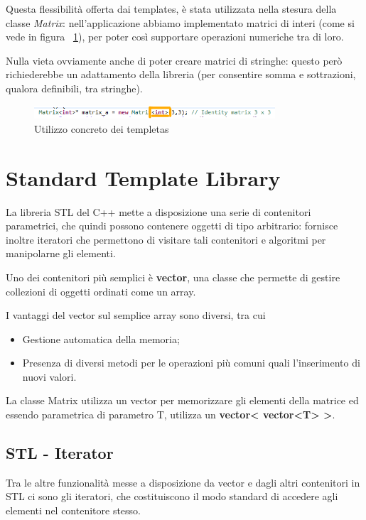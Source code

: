 Questa flessibilità offerta dai templates, è stata utilizzata nella stesura della classe \textit{Matrix}: nell'applicazione abbiamo implementato matrici di interi (come si vede in figura ~\ref{fig:templates}), per poter così supportare operazioni numeriche tra di loro.

Nulla vieta ovviamente anche di poter creare matrici di stringhe: questo però richiederebbe un adattamento della libreria (per consentire somma e sottrazioni, qualora definibili, tra stringhe).
\begin{figure}[h]
	\centering
	\includegraphics[width=0.8\textwidth]{Immagini/ConcreteteTemplates.png}
	\caption{Utilizzo concreto dei templetas}
	\label{fig:templates}
\end{figure}

\section{Standard Template Library}
La libreria STL del C++ mette a disposizione una serie di contenitori parametrici, che quindi
possono contenere oggetti di tipo arbitrario: fornisce inoltre iteratori che permettono di visitare tali contenitori e algoritmi per manipolarne gli elementi.

Uno dei contenitori più semplici è \textbf{vector}, una classe che permette di gestire collezioni di oggetti ordinati come un array.

I vantaggi del vector sul semplice array sono diversi, tra cui 
\begin{itemize}
	\item Gestione automatica della memoria;
	\item Presenza di diversi metodi per le operazioni più comuni quali l'inserimento di nuovi valori.
\end{itemize}

La classe Matrix utilizza un vector per memorizzare gli elementi della matrice ed essendo
parametrica di parametro T, utilizza un \textbf{vector< vector<T> >}.

\subsection{STL - Iterator}
Tra le altre funzionalità messe a disposizione da vector e dagli altri contenitori in STL ci sono gli iteratori, che costituiscono il modo standard di accedere agli elementi nel contenitore stesso. 

